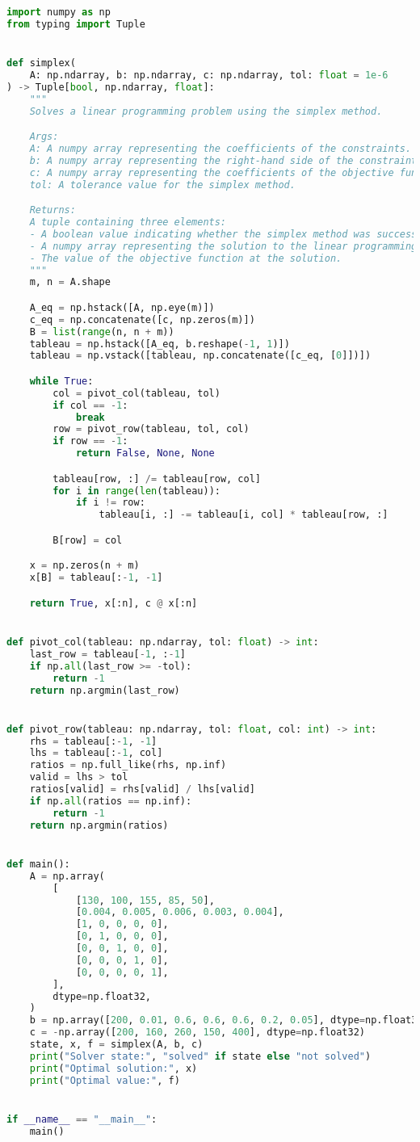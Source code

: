 \documentclass{article}
\begin{document}
\begin{lstlisting}[language=Python]
import numpy as np
from typing import Tuple


def simplex(
    A: np.ndarray, b: np.ndarray, c: np.ndarray, tol: float = 1e-6
) -> Tuple[bool, np.ndarray, float]:
    """
    Solves a linear programming problem using the simplex method.

    Args:
    A: A numpy array representing the coefficients of the constraints.
    b: A numpy array representing the right-hand side of the constraints.
    c: A numpy array representing the coefficients of the objective function.
    tol: A tolerance value for the simplex method.

    Returns:
    A tuple containing three elements:
    - A boolean value indicating whether the simplex method was successful.
    - A numpy array representing the solution to the linear programming problem.
    - The value of the objective function at the solution.
    """
    m, n = A.shape

    A_eq = np.hstack([A, np.eye(m)])
    c_eq = np.concatenate([c, np.zeros(m)])
    B = list(range(n, n + m))
    tableau = np.hstack([A_eq, b.reshape(-1, 1)])
    tableau = np.vstack([tableau, np.concatenate([c_eq, [0]])])

    while True:
        col = pivot_col(tableau, tol)
        if col == -1:
            break
        row = pivot_row(tableau, tol, col)
        if row == -1:
            return False, None, None

        tableau[row, :] /= tableau[row, col]
        for i in range(len(tableau)):
            if i != row:
                tableau[i, :] -= tableau[i, col] * tableau[row, :]

        B[row] = col

    x = np.zeros(n + m)
    x[B] = tableau[:-1, -1]

    return True, x[:n], c @ x[:n]


def pivot_col(tableau: np.ndarray, tol: float) -> int:
    last_row = tableau[-1, :-1]
    if np.all(last_row >= -tol):
        return -1
    return np.argmin(last_row)


def pivot_row(tableau: np.ndarray, tol: float, col: int) -> int:
    rhs = tableau[:-1, -1]
    lhs = tableau[:-1, col]
    ratios = np.full_like(rhs, np.inf)
    valid = lhs > tol
    ratios[valid] = rhs[valid] / lhs[valid]
    if np.all(ratios == np.inf):
        return -1
    return np.argmin(ratios)


def main():
    A = np.array(
        [
            [130, 100, 155, 85, 50],
            [0.004, 0.005, 0.006, 0.003, 0.004],
            [1, 0, 0, 0, 0],
            [0, 1, 0, 0, 0],
            [0, 0, 1, 0, 0],
            [0, 0, 0, 1, 0],
            [0, 0, 0, 0, 1],
        ],
        dtype=np.float32,
    )
    b = np.array([200, 0.01, 0.6, 0.6, 0.6, 0.2, 0.05], dtype=np.float32)
    c = -np.array([200, 160, 260, 150, 400], dtype=np.float32)
    state, x, f = simplex(A, b, c)
    print("Solver state:", "solved" if state else "not solved")
    print("Optimal solution:", x)
    print("Optimal value:", f)


if __name__ == "__main__":
    main()    
\end{lstlisting}
\end{document}
